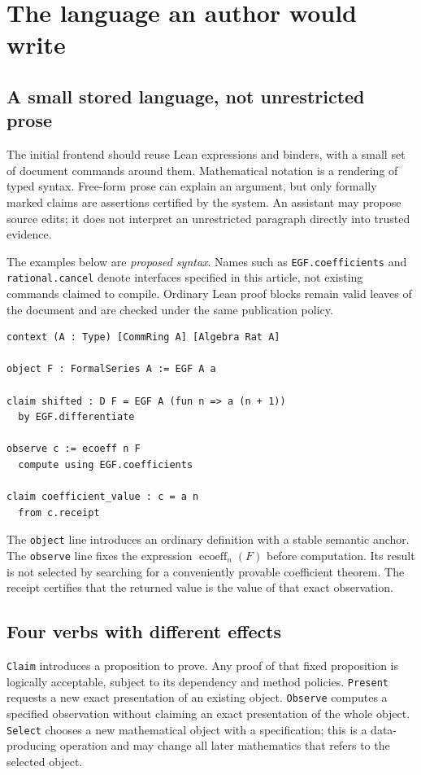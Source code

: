 \documentclass[11pt,a4paper]{article}
\newcommand{\code}[1]{\nolinkurl{#1}}
\newcommand{\ecoeff}{\operatorname{ecoeff}}
\theoremstyle{definition}
\begin{document}
\section{The language an author would write}\label{sec:surface}
\subsection{A small stored language, not unrestricted prose}
The initial frontend should reuse Lean expressions and binders, with a small set
of document commands around them. Mathematical notation is a rendering of typed
syntax. Free-form prose can explain an argument, but only formally marked claims
are assertions certified by the system. An assistant may propose source edits;
it does not interpret an unrestricted paragraph directly into trusted evidence.

The examples below are \emph{proposed syntax}. Names such as \code{EGF.coefficients}
and \code{rational.cancel} denote interfaces specified in this article, not
existing commands claimed to compile. Ordinary Lean proof blocks remain valid
leaves of the document and are checked under the same publication policy.

\begin{lstlisting}
context (A : Type) [CommRing A] [Algebra Rat A]

object F : FormalSeries A := EGF A a

claim shifted : D F = EGF A (fun n => a (n + 1))
  by EGF.differentiate

observe c := ecoeff n F
  compute using EGF.coefficients

claim coefficient_value : c = a n
  from c.receipt
\end{lstlisting}

The \code{object} line introduces an ordinary definition with a stable semantic
anchor. The \code{observe} line fixes the expression \(\ecoeff_n(F)\) before
computation. Its result is not selected by searching for a conveniently provable
coefficient theorem. The receipt certifies that the returned value is the value
of that exact observation.

\subsection{Four verbs with different effects}
\code{Claim} introduces a proposition to prove. Any proof of that fixed proposition
is logically acceptable, subject to its dependency and method policies.
\code{Present} requests a new exact presentation of an existing object.
\code{Observe} computes a specified observation without claiming an exact
presentation of the whole object. \code{Select} chooses a new mathematical object
with a specification; this is a data-producing operation and may change all
later mathematics that refers to the selected object.
\end{document}
